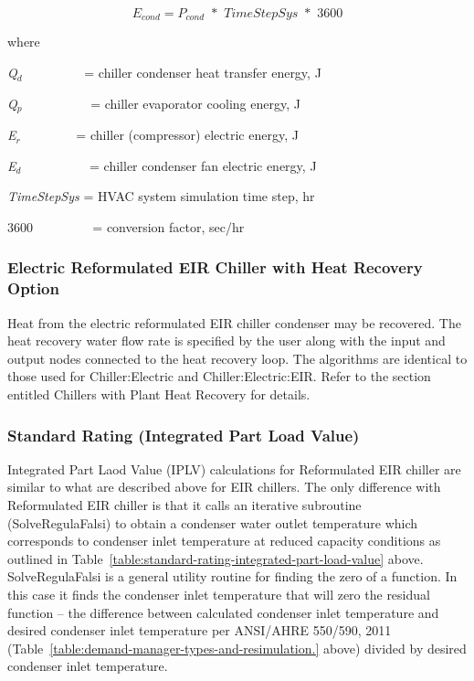 \begin{equation}
{E_{cond}} = {P_{cond}}\,\, * \,\,TimeStepSys\,\,*\,\,3600
\end{equation}

where

\emph{Q\(_{d}\)}~~~~~~~~~ = chiller condenser heat transfer energy, J

\emph{Q\(_{p}\)}~~~~~~~~~~ = chiller evaporator cooling energy, J

\emph{E\(_{r}\)}~~~~~~~~ = chiller (compressor) electric energy, J

\emph{E\(_{d}\)}~~~~~~~~~~ = chiller condenser fan electric energy, J

\emph{TimeStepSys} = HVAC system simulation time step, hr

\(3600\) ~~~~~~~~ = conversion factor, sec/hr

\subsubsection{Electric Reformulated EIR Chiller with Heat Recovery Option}\label{electric-reformulated-eir-chiller-with-heat-recovery-option}

Heat from the electric reformulated EIR chiller condenser may be recovered. The heat recovery water flow rate is specified by the user along with the input and output nodes connected to the heat recovery loop. The algorithms are identical to those used for Chiller:Electric and Chiller:Electric:EIR. Refer to the section entitled Chillers with Plant Heat Recovery for details.

\subsubsection{Standard Rating (Integrated Part Load Value)}\label{standard-rating-integrated-part-load-value-1}

Integrated Part Laod Value (IPLV) calculations for Reformulated EIR chiller are similar to what are described above for EIR chillers. The only difference with Reformulated EIR chiller is that it calls an iterative subroutine (SolveRegulaFalsi) to obtain a condenser water outlet temperature which corresponds to condenser inlet temperature at reduced capacity conditions as outlined in Table~\ref{table:standard-rating-integrated-part-load-value} above. SolveRegulaFalsi is a general utility routine for finding the zero of a function. In this case it finds the condenser inlet temperature that will zero the residual function -- the difference between calculated condenser inlet temperature and desired condenser inlet temperature per ANSI/AHRE 550/590, 2011 (Table~\ref{table:demand-manager-types-and-resimulation.} above) divided by desired condenser inlet temperature.

